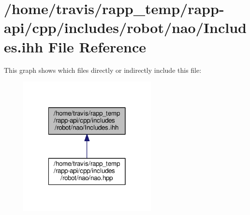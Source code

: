 \hypertarget{robot_2nao_2Includes_8ihh}{\section{/home/travis/rapp\-\_\-temp/rapp-\/api/cpp/includes/robot/nao/\-Includes.ihh File Reference}
\label{robot_2nao_2Includes_8ihh}
}
This graph shows which files directly or indirectly include this file\-:
\nopagebreak
\begin{figure}[H]
\begin{center}
\leavevmode
\includegraphics[width=198pt]{robot_2nao_2Includes_8ihh__dep__incl}
\end{center}
\end{figure}
